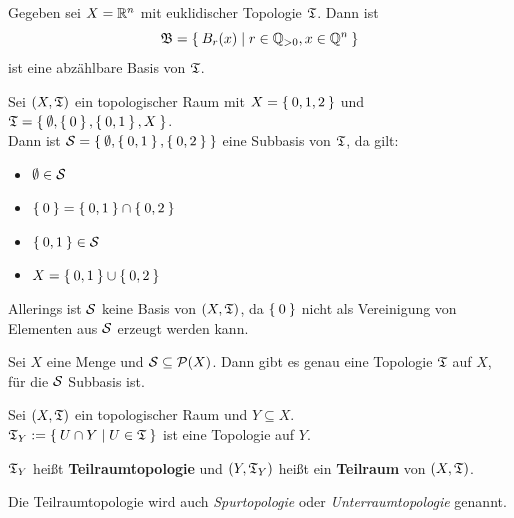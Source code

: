 \begin{beispiel}
    \begin{bspenum}
        \item Gegeben sei $X = \mathbb{R}^n$ mit euklidischer Topologie $\mathfrak{T}$. Dann ist
              \[\mathfrak{B} = \Set{B_r(x) | r \in \ensuremath{\mathbb{Q}}_{> 0}, x \in \ensuremath{\mathbb{Q}}^n}\]
              ist eine abzählbare Basis von $\mathfrak{T}$.
        \item Sei $(X, \mathfrak{T})$ ein topologischer Raum mit 
              $X = \Set{0,1,2}$ und $\mathfrak{T} = \Set{\emptyset, \Set{0}, \Set{0,1}, X}$.\\
              Dann ist $\mathcal{S} = \Set{\emptyset, \Set{0,1}, \Set{0,2}}$ eine Subbasis von 
              $\mathfrak{T}$, da gilt:
              \begin{itemize}
                \item $\emptyset \in \mathcal{S}$
                \item $\Set{0} = \Set{0, 1} \cap \Set{0,2}$
                \item $\Set{0,1} \in \mathcal{S}$
                \item $X = \Set{0,1} \cup \Set{0,2}$
              \end{itemize}
              Allerings ist $\mathcal{S}$ keine Basis von $(X, \mathfrak{T})$, da
              $\Set{0}$ nicht als Vereinigung von Elementen aus $\mathcal{S}$
              erzeugt werden kann.
    \end{bspenum}
\end{beispiel}

\begin{bemerkung}
    Sei $X$ eine Menge und $\mathcal{S} \subseteq \mathcal{P}(X)$. Dann gibt es
    genau eine Topologie $\mathfrak{T}$ auf $X$, für die $\mathcal{S}$ Subbasis ist.
\end{bemerkung}

\begin{definition}%
    Sei $(X, \mathfrak{T})$ ein topologischer Raum und $Y \subseteq X$.\\
    $\mathfrak{T}_Y := \Set{U \cap Y | U \in \mathfrak{T}}$ ist eine Topologie auf $Y$.

    $\mathfrak{T}_Y$ heißt \textbf{Teilraumtopologie} und $(Y, \mathfrak{T}_Y)$ heißt ein 
    \textbf{Teilraum} von $(X, \mathfrak{T})$.
\end{definition}

Die Teilraumtopologie wird auch \textit{Spurtopologie} oder 
\textit{Unterraumtopologie} genannt.

